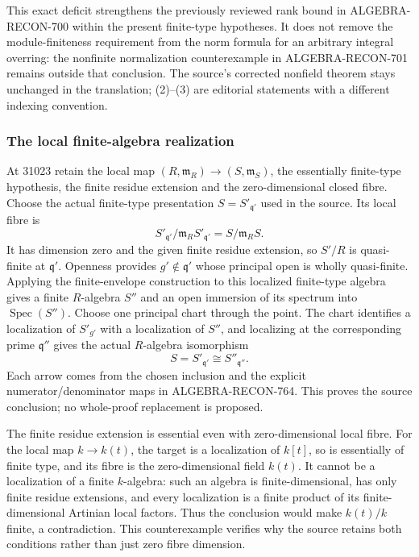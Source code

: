 This exact deficit strengthens the previously reviewed rank bound in ALGEBRA-\AlgebraIdentifierBreak{}RECON-\AlgebraIdentifierBreak{}700 within the present finite-type hypotheses. It does not remove the module-finiteness requirement from the norm formula for an arbitrary integral overring: the nonfinite normalization counterexample in ALGEBRA-\AlgebraIdentifierBreak{}RECON-\AlgebraIdentifierBreak{}701 remains outside that conclusion. The source's corrected nonfield theorem stays unchanged in the translation; (2)--(3) are editorial statements with a different indexing convention.

\subsubsection{The local finite-algebra realization}\label{algebra-proof-033-the-local-finite-algebra-realization}

At 31023 retain the local map \((R,\mathfrak m_R)\to(S,\mathfrak m_S)\), the essentially finite-type hypothesis, the finite residue extension and the zero-dimensional closed fibre. Choose the actual finite-type presentation \(S=S'_{\mathfrak q'}\) used in the source. Its local fibre is \[
 S'_{\mathfrak q'}/\mathfrak m_R S'_{\mathfrak q'}
 =S/\mathfrak m_R S.
\] It has dimension zero and the given finite residue extension, so \(S'/R\) is quasi-finite at \(\mathfrak q'\). Openness provides \(g'\notin\mathfrak q'\) whose principal open is wholly quasi-finite. Applying the finite-envelope construction to this localized finite-type algebra gives a finite \(R\)-algebra \(S''\) and an open immersion of its spectrum into \(\operatorname{Spec}(S'')\). Choose one principal chart through the point. The chart identifies a localization of \(S'_{g'}\) with a localization of \(S''\), and localizing at the corresponding prime \(\mathfrak q''\) gives the actual \(R\)-algebra isomorphism \[
 S=S'_{\mathfrak q'}\cong S''_{\mathfrak q''}.
\] Each arrow comes from the chosen inclusion and the explicit numerator/denominator maps in ALGEBRA-\AlgebraIdentifierBreak{}RECON-\AlgebraIdentifierBreak{}764. This proves the source conclusion; no whole-proof replacement is proposed.

The finite residue extension is essential even with zero-dimensional local fibre. For the local map \(k\to k(t)\), the target is a localization of \(k[t]\), so is essentially of finite type, and its fibre is the zero-dimensional field \(k(t)\). It cannot be a localization of a finite \(k\)-algebra: such an algebra is finite-dimensional, has only finite residue extensions, and every localization is a finite product of its finite-dimensional Artinian local factors. Thus the conclusion would make \(k(t)/k\) finite, a contradiction. This counterexample verifies why the source retains both conditions rather than just zero fibre dimension.

